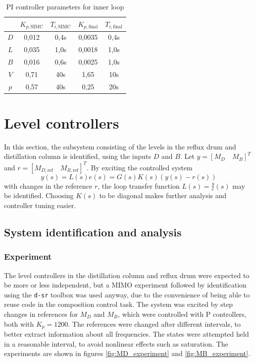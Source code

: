 \documentclass[12pt]{article}
\begin{document}
\begin{table}
\centering
\begin{tabular}{c | c | c : c | c}
& $K_{p, \textrm{SIMC}}$ & $T_{i, \textrm{SIMC}}$ & $K_{p, \textrm{final}}$ & $T_{i, \textrm{final}}$ \\ \hline
$D$ & 0,012 & 0,4s & 0,0035 & 0,4s\\
$L$ &  0,035 & 1,0s & 0,0018 & 1,0s \\
$B$ & 0,016 & 0,6s & 0,0025 & 1,0s \\
$V$ & 0,71 & 40s & 1,65 & 10s \\
$p$ & 0,57 & 40s & 0,25 & 20s
\end{tabular}
\caption{PI controller parameters for inner loop}
\label{tab:inner_loop_PI_parameters}
\end{table}


\newpage
\section{Level controllers}
In this section, the subsystem consisting of the levels in the reflux drum and distillation column is identified, using the inputs $D$ and $B$. Let $y = [M_D \quad M_B]^T$ and $r = [M_{D, \textrm{ref}} \quad M_{B, \textrm{ref}}]^T$. By exciting the controlled system
\begin{equation}
y(s) = L(s)e(s) = G(s) K(s) (y(s) - r(s))
\end{equation}
with changes in the reference $r$, the loop transfer function $L(s) = \frac{y}{e}(s)$ may be identified. Choosing $K(s)$ to be diagonal makes further analysis and controller tuning easier.

\subsection{System identification and analysis}
\subsubsection{Experiment}
The level controllers in the distillation column and reflux drum were expected to be more or less independent, but a MIMO experiment followed by identification using the \texttt{d-sr} toolbox was used anyway, due to the convenience of being able to reuse code in the composition control task. The system was excited by step changes in references for $M_D$ and $M_B$, which were controlled with P controllers, both with $K_p = 1200$. The references were changed after different intervals, to better extract information about all frequencies. The states were attempted held in a reasonable interval, to avoid nonlinear effects such as saturation. The experiments are shown in figures \ref{fig:MD_experiment} and \ref{fig:MB_experiment}.
\end{document}
